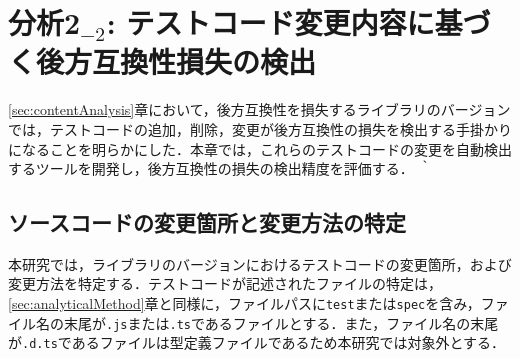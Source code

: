 \documentclass[submit]{ipsj}
\begin{document}
{\vspace{-2mm}
\section{分析2$_{-2}$: テストコード変更内容に基づく後方互換性損失の検出}\label{chap:rq2}

\ref{sec:contentAnalysis}章において，後方互換性を損失するライブラリのバージョンでは，テストコードの追加，削除，変更が後方互換性の損失を検出する手掛かりになることを明らかにした．本章では，これらのテストコードの変更を自動検出するツールを開発し，後方互換性の損失の検出精度を評価する．
｀


\subsection{ソースコードの変更箇所と変更方法の特定}\label{subsec:rq2.astseisei}
本研究では，ライブラリのバージョンにおけるテストコードの変更箇所，および変更方法を特定する．テストコードが記述されたファイルの特定は，\ref{sec:analyticalMethod}章と同様に，ファイルパスに{\verb|test|}または{\verb|spec|}を含み，ファイル名の末尾が{\verb|.js|}または{\verb|.ts|}であるファイルとする．また，ファイル名の末尾が{\verb|.d.ts|}であるファイルは型定義ファイルであるため本研究では対象外とする．

}
\end{document}
